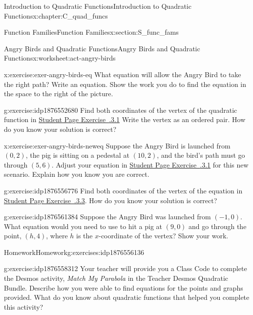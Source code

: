 \documentclass[oneside,10pt,]{book}
\newcommand{\xreffont}{\relax}
\newcommand{\pubtitle}[1]{\textsl{#1}}
\numberwithin{equation}{chapter}
\begin{document}
\begin{chapterptx}{Introduction to Quadratic Functions}{}{Introduction to Quadratic Functions}{}{}{x:chapter:C_quad_funcs}
\begin{sectionptx}{Function Families}{}{Function Families}{}{}{x:section:S_func_fams}
\begin{worksheet-subsection}{Angry Birds and Quadratic Functions}{}{Angry Birds and Quadratic Functions}{}{}{x:worksheet:act-angry-birds}
\begin{divisionexercise}{1}{}{}{x:exercise:exer-angry-birds-eq}
What equation will allow the Angry Bird to take the right path? Write an equation. Show the work you do to find the equation in the space to the right of the picture.%
\end{divisionexercise}%
\begin{divisionexercise}{2}{}{}{g:exercise:idp1876552680}%
Find both coordinates of the vertex of the quadratic function in \hyperlink{x:exercise:exer-angry-birds-eq}{Student Page Exercise~{\xreffont 4.5.3.1}} Write the vertex as an ordered pair. How do you know your solution is correct?%
\end{divisionexercise}%
\begin{divisionexercise}{3}{}{}{x:exercise:exer-angry-birds-neweq}%
Suppose the Angry Bird is launched from \((0,2)\), the pig is sitting on a pedestal at \((10,2)\), and the bird's path must go through \((5, 6)\). Adjust your equation in \hyperlink{x:exercise:exer-angry-birds-eq}{Student Page Exercise~{\xreffont 4.5.3.1}} for this new scenario. Explain how you know you are correct.%
\end{divisionexercise}%
\begin{divisionexercise}{4}{}{}{g:exercise:idp1876556776}%
Find both coordinates of the vertex of the equation in \hyperlink{x:exercise:exer-angry-birds-neweq}{Student Page Exercise~{\xreffont 4.5.3.3}}. How do you know your solution is correct?%
\end{divisionexercise}%
\begin{divisionexercise}{5}{}{}{g:exercise:idp1876561384}%
Suppose the Angry Bird was launched from \((-1,0)\). What equation would you need to use to hit a pig at \((9, 0)\) and go through the point, \((h, 4)\), where \(h\) is the \(x\)-coordinate of the vertex? Show your work.%
\end{divisionexercise}%
\end{worksheet-subsection}
\restoregeometry
%
%
\typeout{************************************************}
\typeout{************************************************}
%
\begin{exercises-subsection}{Homework}{}{Homework}{}{}{g:exercises:idp1876556136}
\begin{divisionexercise}{1}{}{}{g:exercise:idp1876558312}%
Your teacher will provide you a Class Code to complete the Desmos activity, \pubtitle{Match My Parabola} in the Teacher Desmos Quadratic Bundle. Describe how you were able to find equations for the points and graphs provided. What do you know about quadratic functions that helped you complete this activity?%

\end{divisionexercise}
\end{exercises-subsection}
\end{sectionptx}
\end{chapterptx}
\end{document}
